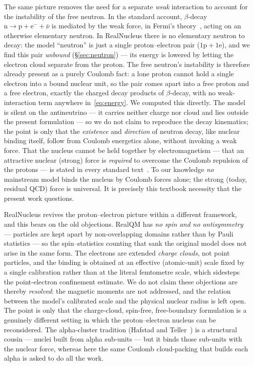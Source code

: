\documentclass[11pt]{article}
\begin{document}
The same picture removes the need for a separate \emph{weak} interaction to account for the
instability of the free neutron. In the standard account, $\beta$-decay $\mathrm{n}\to
\mathrm{p}+\mathrm{e}^-+\bar\nu$ is mediated by the weak force, in Fermi's theory~\cite{Fermi1934},
acting on an otherwise elementary neutron. In RealNucleus there is no elementary neutron to decay: the model ``neutron'' is just a
single proton--electron pair ($\mathrm{1p}+\mathrm{1e}$), and we find this pair \emph{unbound}
(\S\ref{sec:neutron}) --- its energy is lowered by letting the electron cloud separate from the
proton. The free neutron's instability is therefore already present as a purely Coulomb fact: a
lone proton cannot hold a single electron into a bound nuclear unit, so the pair comes apart into
a free proton and a free electron, exactly the charged decay products of $\beta$-decay, with no
weak-interaction term anywhere in~\eqref{eq:energy}. We computed this directly. The model is
silent on the antineutrino --- it carries neither charge nor cloud and lies outside the present
formulation --- so we do not claim to reproduce the decay kinematics; the point is only that the
\emph{existence} and \emph{direction} of neutron decay, like nuclear binding itself, follow from
Coulomb energetics alone, without invoking a weak force. That the nucleus cannot be held together by electromagnetism --- that an
attractive nuclear (strong) force is \emph{required} to overcome the Coulomb repulsion of the
protons --- is stated in every standard text~\cite{Krane,Povh,Griffiths}. To our knowledge
\emph{no} mainstream model binds the nucleus by Coulomb forces alone; the strong (today, residual
QCD) force is universal. It is precisely this textbook necessity that the present work questions.

RealNucleus revives the proton--electron picture within a different framework, and this bears
on the old objections. RealQM has \emph{no spin and no antisymmetry} --- particles are kept
apart by non-overlapping domains rather than by Pauli statistics --- so the spin--statistics
counting that sank the original model does not arise in the same form. The electrons are
extended \emph{charge clouds}, not point particles, and the binding is obtained at an effective
(atomic-unit) scale fixed by a single calibration rather than at the literal femtometre scale,
which sidesteps the point-electron confinement estimate. We do not claim these objections are
thereby \emph{resolved}: the magnetic moments are not addressed, and the relation between the
model's calibrated scale and the physical nuclear radius is left open. The point is only that
the charge-cloud, spin-free, free-boundary formulation is a genuinely different setting in
which the proton--electron nucleus can be reconsidered. The alpha-cluster tradition (Hafstad
and Teller~\cite{HafstadTeller1938}) is a structural cousin --- nuclei built from alpha
sub-units --- but it binds those sub-units with the nuclear force, whereas here the same
Coulomb cloud-packing that builds each alpha is asked to do all the work.
\end{document}
